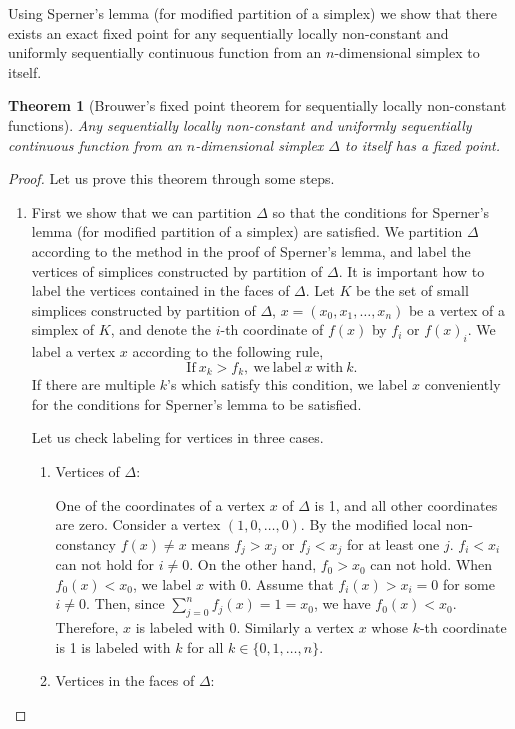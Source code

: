 \documentclass[reqno]{amsart}
\newtheorem{thm}{Theorem}
\begin{document}
Using Sperner's lemma (for modified partition of a simplex) we show that there exists an exact fixed point for any sequentially locally non-constant and uniformly sequentially continuous function from an $n$-dimensional simplex to itself. 
\begin{thm}[Brouwer's fixed point theorem for sequentially  locally non-constant functions]
Any sequentially locally non-constant and uniformly sequentially continuous function from an $n$-dimensional simplex $\Delta$ to itself has a fixed point.
\end{thm}
\begin{proof}
Let us prove this theorem through some steps.
\begin{enumerate}
\item First we show that we can partition $\Delta$ so that the conditions for Sperner's lemma (for modified partition of a simplex) are satisfied. We partition $\Delta$ according to the method in the proof of Sperner's lemma, and label the vertices of simplices constructed by partition of $\Delta$. It is important how to label the vertices contained in the faces of $\Delta$. Let $K$ be the set of small simplices constructed by partition of $\Delta$, $x=(x_0, x_1, \dots, x_n)$ be a vertex of a simplex of $K$, and denote the $i$-th coordinate of $f(x)$ by $f_i$ or $f(x)_i$. We label a vertex $x$ according to the following rule,
\[\mathrm{If}\ x_k>f_k,\ \mathrm{we\ label}\ x\ \mathrm{with}\ k.\]
If there are multiple $k$'s which satisfy this condition, we label $x$ conveniently for the conditions for Sperner's lemma to be satisfied.%

Let us check labeling for vertices in three cases.
\begin{enumerate}
	\item Vertices of $\Delta$:

One of the coordinates of a vertex $x$ of $\Delta$ is 1, and all other coordinates are zero. Consider a vertex $(1, 0, \dots, 0)$. By the modified local non-constancy $f(x)\neq x$ means $f_j>x_j$ or $f_j<x_j$ for at least one $j$. $f_i<x_i$ can not hold for $i\neq 0$. On the other hand, $f_0>x_0$ can not hold. When $f_0(x)<x_0$, we label $x$ with 0. Assume that $f_i(x)>x_i=0$ for some $i\neq 0$. Then, since $\sum_{j=0}^nf_j(x)=1=x_0$, we have $f_0(x)<x_0$. Therefore, $x$ is labeled with 0. Similarly a vertex $x$ whose $k$-th coordinate is 1 is labeled with $k$ for all $k\in \{0, 1, \dots, n\}$.

	\item Vertices in the faces of $\Delta$:


\end{enumerate}
\end{enumerate}
\end{proof}
\end{document}
